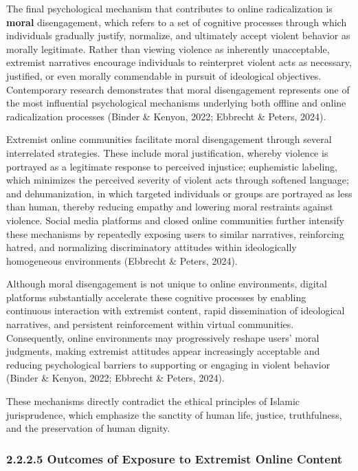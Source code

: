 \documentclass[10pt]{NSP1}
\begin{document}
	The final psychological mechanism that contributes to online radicalization is \textbf{moral} disengagement, which refers to a set of cognitive processes through which individuals gradually justify, normalize, and ultimately accept violent behavior as morally legitimate. Rather than viewing violence as inherently unacceptable, extremist narratives encourage individuals to reinterpret violent acts as necessary, justified, or even morally commendable in pursuit of ideological objectives. Contemporary research demonstrates that moral disengagement represents one of the most influential psychological mechanisms underlying both offline and online radicalization processes (Binder \& Kenyon, 2022; Ebbrecht \& Peters, 2024).
	
	Extremist online communities facilitate moral disengagement through several interrelated strategies. These include moral justification, whereby violence is portrayed as a legitimate response to perceived injustice; euphemistic labeling, which minimizes the perceived severity of violent acts through softened language; and dehumanization, in which targeted individuals or groups are portrayed as less than human, thereby reducing empathy and lowering moral restraints against violence. Social media platforms and closed online communities further intensify these mechanisms by repeatedly exposing users to similar narratives, reinforcing hatred, and normalizing discriminatory attitudes within ideologically homogeneous environments (Ebbrecht \& Peters, 2024).
	
	Although moral disengagement is not unique to online environments, digital platforms substantially accelerate these cognitive processes by enabling continuous interaction with extremist content, rapid dissemination of ideological narratives, and persistent reinforcement within virtual communities. Consequently, online environments may progressively reshape users' moral judgments, making extremist attitudes appear increasingly acceptable and reducing psychological barriers to supporting or engaging in violent behavior (Binder \& Kenyon, 2022; Ebbrecht \& Peters, 2024).
	
	These mechanisms directly contradict the ethical principles of Islamic jurisprudence, which emphasize the sanctity of human life, justice, truthfulness, and the preservation of human dignity.
	
	\subsubsection*{2.2.2.5 Outcomes of Exposure to Extremist Online Content}
	
\end{document}
